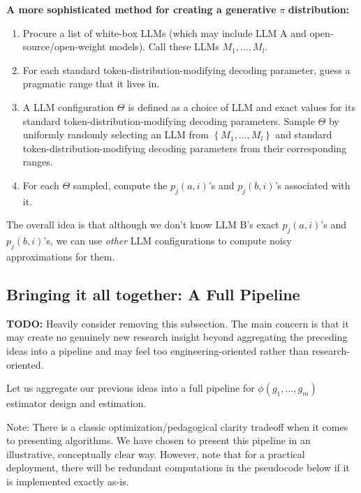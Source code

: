 \documentclass{article}
\begin{document}
\textbf{A more sophisticated method for creating a generative }$\displaystyle \pi $\textbf{ distribution:}
\begin{enumerate}
\item Procure a list of white-box LLMs (which may include LLM A and open-source/open-weight models). Call these LLMs $\displaystyle M_{1} ,...,M_{l}$.
\item For each standard token-distribution-modifying decoding parameter, guess a pragmatic range that it lives in.
\item A LLM configuration $\displaystyle \Theta $ is defined as a choice of LLM and exact values for its standard token-distribution-modifying decoding parameters. Sample $\displaystyle \Theta $ by uniformly randomly selecting an LLM from $\displaystyle \left\{M_{1} ,...,M_{l}\right\}$ and standard token-distribution-modifying decoding parameters from their corresponding ranges.
\item For each $\displaystyle \Theta $ sampled, compute the $\displaystyle p_{j}\left( a,i\right)$'s and $\displaystyle p_{j}\left( b,i\right)$'s associated with it.
\end{enumerate}

The overall idea is that although we don't know LLM B's exact $\displaystyle p_{j}\left( a,i\right)$'s and $\displaystyle p_{j}\left( b,i\right)$'s, we can use \textit{other} LLM configurations to compute noisy approximations for them.



\subsection{Bringing it all together: A Full Pipeline}

\textbf{TODO:} Heavily consider removing this subsection. The main concern is that it may create no genuinely new research insight beyond aggregating the preceding ideas into a pipeline and may feel too engineering-oriented rather than research-oriented.

Let us aggregate our previous ideas into a full pipeline for $\displaystyle \phi \left( g_{1} ,...,g_{m}\right)$ estimator design and estimation.



Note: There is a classic optimization/pedagogical clarity tradeoff when it comes to presenting algorithms. We have chosen to present this pipeline in an illustrative, conceptually clear way. However, note that for a practical deployment, there will be redundant computations in the pseudocode below if it is implemented exactly as-is.
\end{document}
